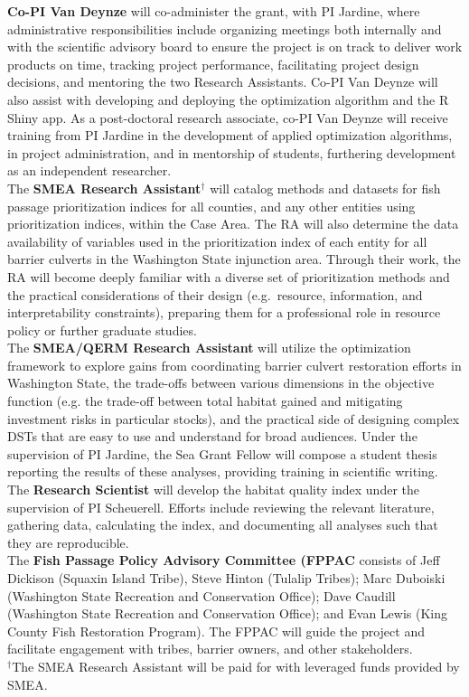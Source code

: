 \documentclass[12pt]{elsarticle}
\begin{document}
\textbf{Co-PI Van Deynze} will co-administer the grant, with PI Jardine, where administrative responsibilities include organizing meetings both internally and with the scientific advisory board to ensure the project is on track to deliver work products on time, tracking project performance, facilitating project design decisions, and mentoring the two Research Assistants. Co-PI Van Deynze will also assist with developing and deploying the optimization algorithm and the R Shiny app. As a post-doctoral research associate, co-PI Van Deynze will receive training from PI Jardine in the development of applied optimization algorithms, in project administration, and in mentorship of students, furthering development as an independent researcher. \\

The \textbf{SMEA Research Assistant$^\dagger$} will catalog methods and datasets for fish passage prioritization indices for all counties, and any other entities using prioritization indices, within the Case Area. The RA will also determine the data availability of variables used in the prioritization index of each entity for all barrier culverts in the Washington State injunction area. Through their work, the RA will become deeply familiar with a diverse set of prioritization methods and the practical considerations of their design (e.g.\ resource, information, and interpretability constraints), preparing them for a professional role in resource policy or further graduate studies. \\

The \textbf{SMEA/QERM Research Assistant} will utilize the optimization framework to explore gains from coordinating barrier culvert restoration efforts in Washington State, the trade-offs between various dimensions in the objective function (e.g. the trade-off between total habitat gained and mitigating investment risks in particular stocks), and the practical side of designing complex DSTs that are easy to use and understand for broad audiences. Under the supervision of PI Jardine, the Sea Grant Fellow will compose a student thesis reporting the results of these analyses, providing training in scientific writing. \\

The \textbf{Research Scientist} will develop the habitat quality index under the supervision of PI Scheuerell. Efforts include reviewing the relevant literature, gathering data, calculating the index, and documenting all analyses such that they are reproducible.\\


The \textbf{Fish Passage Policy Advisory Committee (FPPAC} consists of Jeff Dickison (Squaxin Island Tribe), Steve Hinton (Tulalip Tribes); Marc Duboiski (Washington State Recreation and Conservation Office); Dave Caudill (Washington State Recreation and Conservation Office); and Evan Lewis (King County Fish Restoration Program). The FPPAC will guide the project and facilitate engagement with tribes, barrier owners, and other stakeholders.\\


\noindent $^\dagger$The SMEA Research Assistant will be paid for with leveraged funds provided by SMEA.
\end{document}
